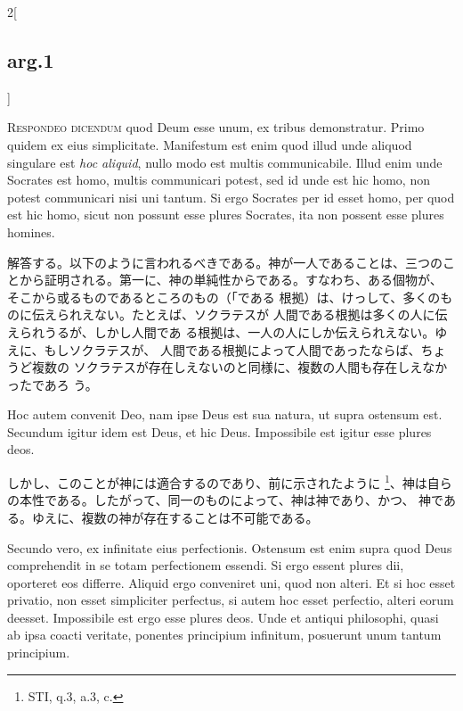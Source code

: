 \documentclass[paper=a4paper,fontsize=10pt,jafontsize=9pt,titlepage]{jlreq}
\begin{document}
\begin{paracol}{2}[\subsection{arg.1}]

{\scshape Respondeo dicendum} quod Deum esse unum, ex tribus
demonstratur. Primo quidem ex eius simplicitate. Manifestum est enim
quod illud unde aliquod singulare est {\itshape hoc aliquid}, nullo modo est multis
communicabile. Illud enim unde Socrates est homo, multis communicari
potest, sed id unde est hic homo, non potest communicari nisi uni
tantum. Si ergo Socrates per id esset homo, per quod est hic homo, sicut
non possunt esse plures Socrates, ita non possent esse plures
homines.

\switchcolumn

解答する。以下のように言われるべきである。神が一人であることは、三つのこ
とから証明される。第一に、神の単純性からである。すなわち、ある個物が、
そこから或るものであるところのもの（「である
根拠）は、けっして、多くのものに伝えられえない。たとえば、ソクラテスが
人間である根拠は多くの人に伝えられうるが、しかし人間であ
る根拠は、一人の人にしか伝えられえない。ゆえに、もしソクラテスが、
人間である根拠によって人間であったならば、ちょうど複数の
ソクラテスが存在しえないのと同様に、複数の人間も存在しえなかったであろ
う。

\switchcolumn*

Hoc autem convenit Deo, nam ipse Deus est sua natura, ut supra
ostensum est. Secundum igitur idem est Deus, et hic Deus. Impossibile
est igitur esse plures deos.

\switchcolumn

しかし、このことが神には適合するのであり、前に示されたように
 \footnote{STI, q.3, a.3, c.}、神は自ら
の本性である。したがって、同一のものによって、神は神であり、かつ、
神である。ゆえに、複数の神が存在することは不可能である。

\switchcolumn*

Secundo vero, ex infinitate eius
perfectionis. Ostensum est enim supra quod Deus comprehendit in se totam
perfectionem essendi. Si ergo essent plures dii, oporteret eos
differre. Aliquid ergo conveniret uni, quod non alteri. Et si hoc esset
privatio, non esset simpliciter perfectus, si autem hoc esset perfectio,
alteri eorum deesset. Impossibile est ergo esse plures deos. Unde et
antiqui philosophi, quasi ab ipsa coacti veritate, ponentes principium
infinitum, posuerunt unum tantum principium.


\end{paracol}
\end{document}
